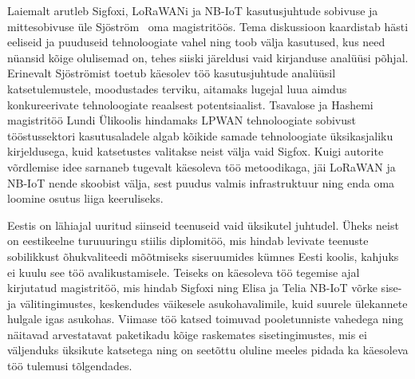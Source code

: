 \documentclass[12pt]{article}
\begin{document}
    Laiemalt arutleb Sigfoxi, LoRaWANi ja NB-IoT kasutusjuhtude sobivuse ja mittesobivuse üle Sjöström~\cite{sjostrom2017unlicensed} oma magistritöös.
    Tema diskussioon kaardistab hästi eeliseid ja puuduseid tehnoloogiate vahel ning toob välja kasutused, kus need nüansid kõige olulisemad on, tehes siiski järeldusi vaid kirjanduse analüüsi põhjal.
    Erinevalt Sjöströmist toetub käesolev töö kasutusjuhtude analüüsil katsetulemustele, moodustades terviku, aitamaks lugejal luua aimdus konkureerivate tehnoloogiate reaalsest potentsiaalist.
    Tsavalose ja Hashemi~\cite{tsavalos2018low} magistritöö Lundi Ülikoolis hindamaks LPWAN tehnoloogiate sobivust tööstussektori kasutusaladele algab kõikide samade tehnoloogiate üksikasjaliku kirjeldusega, kuid katsetustes valitakse neist välja vaid Sigfox.
    Kuigi autorite võrdlemise idee sarnaneb tugevalt käesoleva töö metoodikaga, jäi LoRaWAN ja NB-IoT nende skoobist välja, sest puudus valmis infrastruktuur ning enda oma loomine osutus liiga keeruliseks.

    Eestis on lähiajal uuritud siinseid teenuseid vaid üksikutel juhtudel.
    Üheks neist on eestikeelne turuuuringu stiilis diplomitöö, mis hindab levivate teenuste sobilikkust õhukvaliteedi mõõtmiseks siseruumides kümnes Eesti koolis, kahjuks ei kuulu see töö avalikustamisele.
    Teiseks on käesoleva töö tegemise ajal kirjutatud magistritöö, mis hindab Sigfoxi ning Elisa ja Telia NB-IoT võrke sise- ja välitingimustes, keskendudes väikesele asukohavalimile, kuid suurele ülekannete hulgale igas asukohas.
    Viimase töö katsed toimuvad pooletunniste vahedega ning näitavad arvestatavat paketikadu kõige raskemates sisetingimustes, mis ei väljenduks üksikute katsetega ning on seetõttu oluline meeles pidada ka käesoleva töö tulemusi tõlgendades.




\end{document}

